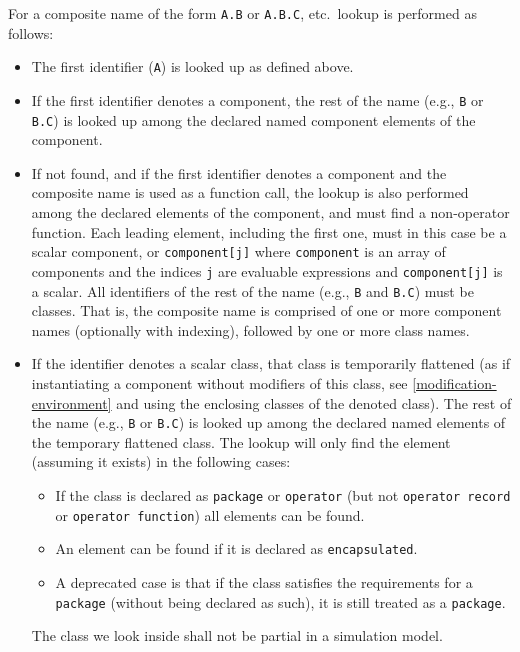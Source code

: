 For a composite name of the form \lstinline!A.B! or \lstinline!A.B.C!, etc.\ lookup is performed as follows:
\begin{itemize}
\item
  The first identifier (\lstinline!A!) is looked up as defined above.
\item
  If the first identifier denotes a component, the rest of the name (e.g., \lstinline!B! or \lstinline!B.C!) is looked up among the declared named component elements of the component.
\item
  If not found, and if the first identifier denotes a component and the composite name is used as a function call, the lookup is also performed among the declared elements of the component, and must find a non-operator function.
  Each leading element, including the first one, must in this case be a scalar component, or \lstinline!component[j]! where \lstinline!component! is an array of components and the indices \lstinline!j! are evaluable expressions and \lstinline!component[j]! is a scalar.
  All identifiers of the rest of the name (e.g., \lstinline!B! and \lstinline!B.C!) must be classes.
  That is, the composite name is comprised of one or more component names (optionally with indexing), followed by one or more class names.
\item
  If the identifier denotes a scalar class, that class is temporarily flattened (as if instantiating a component without modifiers of this class, see \cref{modification-environment} and using the enclosing classes of the denoted class).
  The rest of the name (e.g., \lstinline!B! or \lstinline!B.C!) is looked up among the declared named elements of the temporary flattened class.
  The lookup will only find the element (assuming it exists) in the following cases:
  \begin{itemize}
  \item If the class is declared as \lstinline!package! or \lstinline!operator! (but not \lstinline!operator record! or \lstinline!operator function!) all elements can be found.
  \item An element can be found if it is declared as \lstinline!encapsulated!.
  \item A deprecated case is that if the class satisfies the requirements for a \lstinline!package! (without being declared as such), it is still treated as a \lstinline!package!.
  \end{itemize}
  The class we look inside shall not be partial in a simulation model.
\end{itemize}

